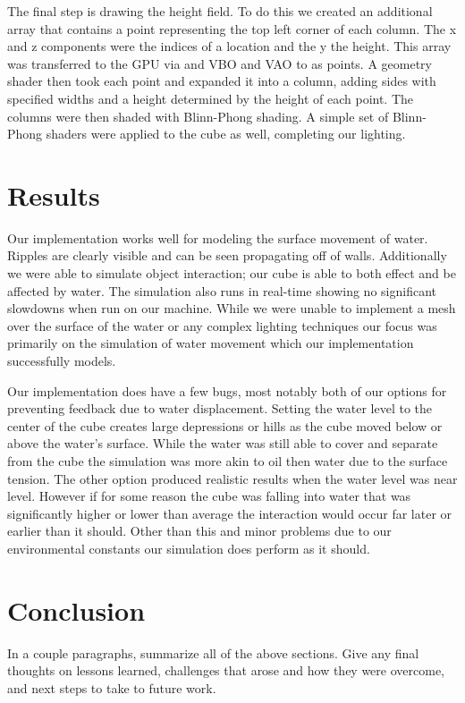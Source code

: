 \documentclass[12pt,titlepage]{article}
\begin{document}
The final step is drawing the height field.  To do this we created an additional array that contains a point representing the top left corner of each column.  The x and z components were the indices of a location and the y the height.  This array was transferred to the GPU via and VBO and VAO to as points.  A geometry shader then took each point and expanded it into a column, adding sides with specified widths and a height determined by the height of each point.  The columns were then shaded with Blinn-Phong shading.  A simple set of Blinn-Phong shaders were applied to the cube as well, completing our lighting.

\section{Results}

Our implementation works well for modeling the surface movement of water.  Ripples are clearly visible and can be seen propagating off of walls. Additionally we were able to simulate object interaction; our cube is able to both effect and be affected by water.  The simulation also runs in real-time showing no significant slowdowns when run on our machine. While we were unable to implement a mesh over the surface of the water or any complex lighting techniques our focus was primarily on the simulation of water movement which our implementation successfully models.

Our implementation does have a few bugs, most notably both of our options for preventing feedback due to water displacement.  Setting the water level to the center of the cube creates large depressions or hills as the cube moved below or above the water’s surface.  While the water was still able to cover and separate from the cube the simulation was more akin to oil then water due to the surface tension.  The other option produced realistic results when the water level was near level.  However if for some reason the cube was falling into water that was significantly higher or lower than average the interaction would occur far later or earlier than it should.  Other than this and minor problems due to our environmental constants our simulation does perform as it should.

\section{Conclusion}

In a couple paragraphs, summarize all of the above sections. Give any final thoughts on lessons learned, challenges that arose and how they were overcome, and next steps to take to future work.

\nocite{*}
\printbibliography
\end{document}
